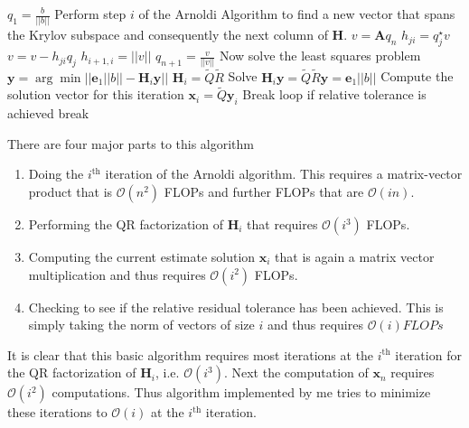 \documentclass{article}
\begin{document}
\begin{enumerate}
	\begin{algorithmic}
	\State $q_1 = \frac{b}{  || b ||}$
		\State Perform step $i$ of the Arnoldi Algorithm to find a new vector that spans the Krylov subspace and consequently the next column of $\boldsymbol{H}$.
		\State $v = \boldsymbol{A} q_n$ 
			\State $h_{ji} = q^\star_j v$
			\State $v = v - h_{ji}q_j$
		\EndFor
		\State $h_{i+1,i} = ||v||$
		\State $q_{n+1} = \frac{v}{||v||}$
		\State
		\State Now solve the least squares problem $\boldsymbol{y} = \arg\min || \boldsymbol{e}_1||b|| - \boldsymbol{H}_i \boldsymbol{y} ||$
		\State $\boldsymbol{H}_i = \widetilde{Q}\widetilde{R} $
		\State Solve $\boldsymbol{H}_i \boldsymbol{y} = \widetilde{Q}\widetilde{R}\boldsymbol{y} = \boldsymbol{e}_1||b||$
		\State
		\State Compute the solution vector for this iteration
		\State $\boldsymbol{x}_i = \widetilde{Q}\boldsymbol{y}_i$
    \State Break loop if relative tolerance is achieved
        \State break
    \EndIf
	\EndFor
	\end{algorithmic}
	
	There are four major parts to this algorithm
	
	\begin{enumerate}
		\item Doing the $i^\text{th}$ iteration of the Arnoldi algorithm. This requires a matrix-vector product that is $\mathcal{O}(n^2)$ FLOPs and further FLOPs that are $\mathcal{O}(in)$. 
		\item Performing the QR factorization of $\boldsymbol{H}_i$ that requires $\mathcal{O}(i^3)$ FLOPs. 
		\item Computing the current estimate solution $\boldsymbol{x}_i$ that is again a matrix vector multiplication and thus requires $\mathcal{O}(i^2)$ FLOPs. 
		\item Checking to see if the relative residual tolerance has been achieved. This is simply taking the norm of vectors of size $i$ and thus requires $\mathcal{O}(i) FLOPs$
	\end{enumerate}
	
	It is clear that this basic algorithm requires most iterations at the $i^\text{th}$ iteration for the QR factorization of $\boldsymbol{H}_i$, i.e. $\mathcal{O}(i^3)$. Next the computation of $\boldsymbol{x}_n$ requires $\mathcal{O}(i^2)$ computations. Thus algorithm implemented by me tries to minimize these iterations to $\mathcal{O}(i)$ at the $i^\text{th}$ iteration.
	

\end{enumerate}
\end{document}
